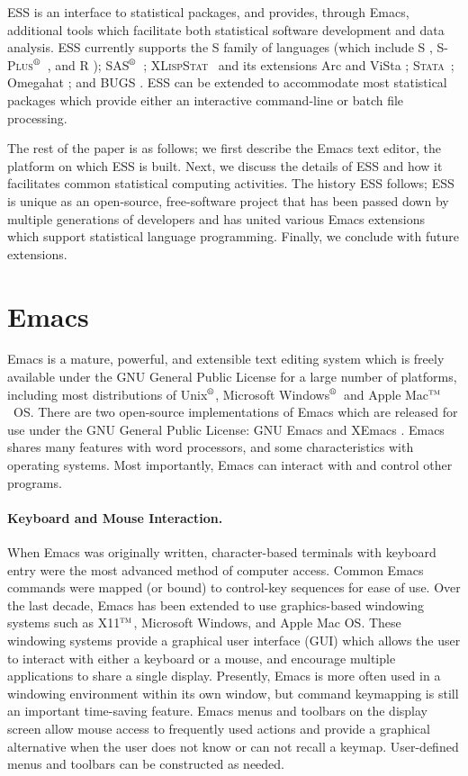 \documentclass{article}
\newcommand*{\regstrd}{$^{\mbox{\scriptsize{\textregistered}}}$}
\newcommand*{\tm}{$^{\mbox{\scriptsize\sc tm}}$}
\newcommand*{\SAS}{\textsc{SAS}}
\newcommand*{\Splus}{\textsc{S-Plus}}
\newcommand*{\XLispStat}{\textsc{XLispStat}}
\newcommand*{\Stata}{\textsc{Stata}}
\begin{document}
ESS is an interface to statistical packages, and provides,
through Emacs, additional tools which facilitate both statistical
software development and data analysis.  ESS currently supports
the S family of languages (which include
S \citep{BecRCW88,ChaJH92,ChaJ98}, \Splus\regstrd\ \citep{Splus}, and R
\citep{ihak:gent:1996}); \SAS\regstrd\ \citep{SAS:8}; \XLispStat\
\citep{Tier90} and its extensions Arc \citep{Cook:Weisberg:1999} and
ViSta \citep{youn:fald:mcfa:1992}; \Stata\ \citep{Stata:6.0}; Omegahat
\citep{DTLang:2000}; and BUGS \citep{BUGS}.  ESS can be
extended to accommodate most statistical packages which provide either
an interactive command-line or batch file processing.

The rest of the paper is as follows; we first describe the Emacs text
editor, the platform on which ESS is built.  Next, we discuss the
details of ESS and how it facilitates common statistical computing
activities.  The history ESS follows; ESS is unique as an open-source,
free-software project that has been passed down by multiple
generations of developers and has united various Emacs extensions
which support statistical language programming.  Finally, we conclude
with future extensions.

\section{Emacs}
\label{sec:emacs}

Emacs is a mature, powerful, and extensible text editing system which
is freely available under the GNU General Public License for a large
number of platforms, including most distributions of Unix\regstrd, Microsoft
Windows\regstrd\ and Apple Mac\tm\ OS.  There are two open-source
implementations of Emacs which are released for use under the GNU
General Public License: GNU Emacs \citep{GNU-Emacs} and XEmacs
\citep{XEmacs}.  Emacs shares many features with word processors, and
some characteristics with operating systems.  Most importantly, Emacs
can interact with and control other programs.

\paragraph{Keyboard and Mouse Interaction.}
When Emacs was originally written, character-based terminals with
keyboard entry were the most advanced method of computer access.
Common Emacs commands were mapped (or bound) to control-key sequences
for ease of use.  Over the last decade, Emacs has been extended to use
graphics-based windowing systems such as X11\tm, Microsoft Windows,
and Apple Mac OS.  These windowing systems provide a graphical user
interface (GUI) which allows the user to interact with either a
keyboard or a mouse, and encourage multiple applications to share a
single display.  Presently, Emacs is more often used in a windowing
environment within its own window, but command keymapping is still an
important time-saving feature.  Emacs menus and toolbars on the
display screen allow mouse access to frequently used actions and
provide a graphical alternative when the user does not know or can not
recall a keymap.  User-defined menus and toolbars can be constructed
as needed.
\end{document}
